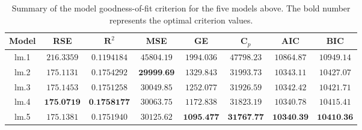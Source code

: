 \documentclass[12pt]{amsart}
\begin{document}
\begin{table}[H]
    \centering
    \renewcommand{\arraystretch}{1.2}
        \begin{tabular}{ c c c c c c c c}
            \hline
             \textbf{Model} & \textbf{RSE} & $\boldsymbol{R}^2$ & \textbf{MSE} & \textbf{GE} & $\boldsymbol{C}_p$ & \textbf{AIC} & \textbf{BIC}  \\ \hline
             lm.1 & $216.3359$ & $0.1194184$ & $45804.19$ & $1994.036$ & $47798.23$ & $10864.87$ & $10949.14$ \\
             lm.2 & $175.1131$ & $0.1754292$ & $\textbf{29999.69}$ & $1329.843$ & $31993.73$ & $10343.11$ & $10427.07$ \\
             lm.3 & $175.1453$ & $0.1751258$ & $30049.85$ & $1252.077$ & $31926.59$ & $10342.42$ & $10421.71$ \\
             lm.4 & $\textbf{175.0719}$ & $\textbf{0.1758177}$ & $30063.75$ & $1172.838$ & $31823.19$ & $10340.78$ & $10415.41$ \\
             lm.5 & $175.1381$ & $0.1751940$ & $30125.62$ & $\textbf{1095.477}$ & $\textbf{31767.77}$ & $\textbf{10340.39}$ & $\textbf{10410.36}$ \\ \hline
        \end{tabular}
 \vspace{10pt}
 \caption{Summary of the model goodness-of-fit criterion for the five models above. The bold number represents the optimal criterion values.}
\label{tab2}
\end{table}
\end{document}
